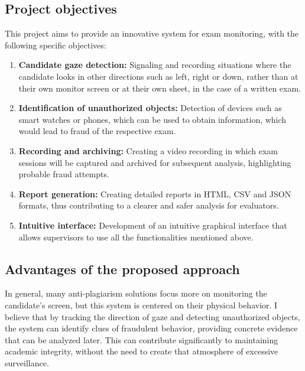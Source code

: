 \documentclass[12pt,a4paper]{article}
\begin{document}
\newpage

\subsection{Project objectives}

This project aims to provide an innovative system for exam monitoring, with the following specific objectives:

\begin{enumerate}[label=\arabic*.]
    \item \textbf{Candidate gaze detection:} Signaling and recording situations
    where the candidate looks in other directions such as left, right or down, 
    rather than at their own monitor screen or at their own sheet, in the case of a written exam.
    
    \item \textbf{Identification of unauthorized objects:} Detection of devices such as
    smart watches or phones, which can be used to obtain information, 
    which would lead to fraud of the respective exam.
    
    \item \textbf{Recording and archiving:} Creating a video recording in which 
    exam sessions will be captured and archived for subsequent analysis, 
    highlighting probable fraud attempts.
    
    \item \textbf{Report generation:} Creating detailed reports in HTML, CSV and JSON formats,
    thus contributing to a clearer and safer analysis for evaluators.
    
    \item \textbf{Intuitive interface:} Development of an intuitive graphical interface that allows
    supervisors to use all the functionalities mentioned above.
\end{enumerate}

\subsection{Advantages of the proposed approach}

In general, many anti-plagiarism solutions focus more 
on monitoring the candidate's screen, but this system is centered on 
their physical behavior. I believe that by tracking the direction of gaze 
and detecting unauthorized objects, the system can identify clues of
fraudulent behavior, providing concrete evidence that can be analyzed later. 
This can contribute significantly to maintaining academic integrity, 
without the need to create that atmosphere of excessive surveillance.
\end{document}
